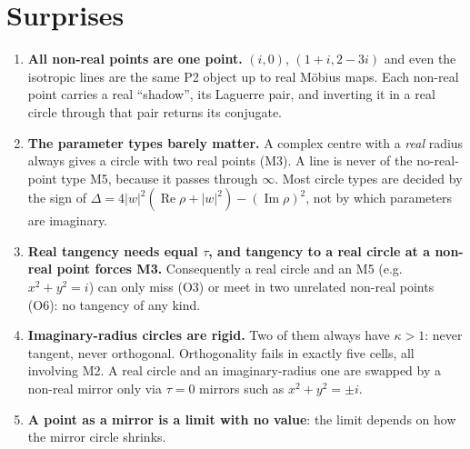\documentclass[11pt]{article}
\theoremstyle{definition}\newtheorem{definition}[theorem]{Definition}\newtheorem{remark}[theorem]{Remark}\newtheorem{example}[theorem]{Example}
\newcommand{\cls}[1]{\textsf{#1}}
\renewcommand{\Re}{\operatorname{Re}}\renewcommand{\Im}{\operatorname{Im}}
\begin{document}
\section{Surprises}\label{sec:surprises}
\begin{enumerate}
\item \textbf{All non-real points are one point.} $(i,0)$, $(1+i,2-3i)$ and even the isotropic lines are the same \cls{P2} object up to real Möbius maps. Each non-real point carries a real ``shadow'', its Laguerre pair, and inverting it in a real circle through that pair returns its conjugate.
\item \textbf{The parameter types barely matter.} A complex centre with a \emph{real} radius always gives a circle with two real points (\cls{M3}). A line is never of the no-real-point type \cls{M5}, because it passes through $\infty$. Most circle types are decided by the sign of $\Delta=4|w|^2(\Re\rho+|w|^2)-(\Im\rho)^2$, not by which parameters are imaginary.
\item \textbf{Real tangency needs equal $\tau$, and tangency to a real circle at a non-real point forces \cls{M3}.} Consequently a real circle and an \cls{M5} (e.g.\ $x^2+y^2=i$) can only miss (O3) or meet in two unrelated non-real points (O6): no tangency of any kind.
\item \textbf{Imaginary-radius circles are rigid.} Two of them always have $\kappa>1$: never tangent, never orthogonal. Orthogonality fails in exactly five cells, all involving \cls{M2}. A real circle and an imaginary-radius one are swapped by a non-real mirror only via $\tau=0$ mirrors such as $x^2+y^2=\pm i$.
\item \textbf{A point as a mirror is a limit with no value}: the limit depends on how the mirror circle shrinks.
\end{enumerate}
\end{document}
